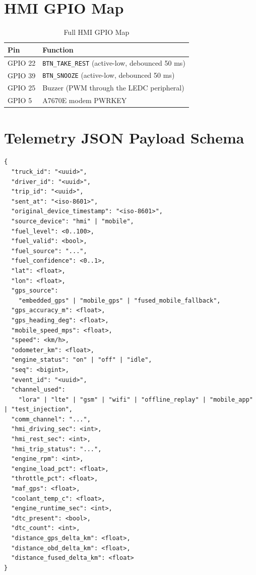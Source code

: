 \section{HMI GPIO Map}

\begin{table}[!htbp]
\centering
\caption{Full HMI GPIO Map}
\label{tab:appendix_hmi_gpio_map}
\begin{tabular}{|p{}|p{}|}
\hline
\textbf{Pin} & \textbf{Function} \\
\hline
GPIO 22 & \texttt{BTN\_TAKE\_REST} (active-low, debounced 50 ms) \\
\hline
GPIO 39 & \texttt{BTN\_SNOOZE} (active-low, debounced 50 ms) \\
\hline
GPIO 25 & Buzzer (PWM\glsadd{PWM} through the LEDC peripheral) \\
\hline
GPIO 5 & A7670E modem PWRKEY \\
\hline
\end{tabular}
\end{table}

\section{Telemetry JSON Payload Schema}

\begin{lstlisting}[caption=Telemetry JSON Payload Schema,label=lst:appendix_telemetry_json_schema]
{
  "truck_id": "<uuid>",
  "driver_id": "<uuid>",
  "trip_id": "<uuid>",
  "sent_at": "<iso-8601>",
  "original_device_timestamp": "<iso-8601>",
  "source_device": "hmi" | "mobile",
  "fuel_level": <0..100>,
  "fuel_valid": <bool>,
  "fuel_source": "...",
  "fuel_confidence": <0..1>,
  "lat": <float>,
  "lon": <float>,
  "gps_source":
    "embedded_gps" | "mobile_gps" | "fused_mobile_fallback",
  "gps_accuracy_m": <float>,
  "gps_heading_deg": <float>,
  "mobile_speed_mps": <float>,
  "speed": <km/h>,
  "odometer_km": <float>,
  "engine_status": "on" | "off" | "idle",
  "seq": <bigint>,
  "event_id": "<uuid>",
  "channel_used":
    "lora" | "lte" | "gsm" | "wifi" | "offline_replay" | "mobile_app" | "test_injection",
  "comm_channel": "...",
  "hmi_driving_sec": <int>,
  "hmi_rest_sec": <int>,
  "hmi_trip_status": "...",
  "engine_rpm": <int>,
  "engine_load_pct": <float>,
  "throttle_pct": <float>,
  "maf_gps": <float>,
  "coolant_temp_c": <float>,
  "engine_runtime_sec": <int>,
  "dtc_present": <bool>,
  "dtc_count": <int>,
  "distance_gps_delta_km": <float>,
  "distance_obd_delta_km": <float>,
  "distance_fused_delta_km": <float>
}
\end{lstlisting}
